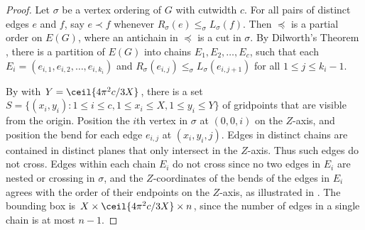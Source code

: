 \documentclass[10pt,a4paper]{article}
\begin{document}
\begin{proof} Let $\sigma$ be a vertex ordering of $G$ with cutwidth $c$. For
all pairs of distinct edges $e$ and $f$, say $e\prec f$ whenever
$R_\sigma(e)\leq_\sigma L_\sigma(f)$. Then $\preceq$ is a partial order on
$E(G)$, where an antichain in $\preceq$ is a cut in $\sigma$. By Dilworth's
Theorem \citep{Dilworth50}, there is a partition of $E(G)$ into chains
$E_1,E_2,\dots,E_c$, such that each $E_i=(e_{i,1},e_{i,2},\dots,e_{i,k_i})$ and
$R_\sigma(e_{i,j})\leq_\sigma L_\sigma(e_{i,j+1})$ for all $1\leq j\leq k_i-1$.

By  with $Y=\ceil{4\pi^2c/3X}$,  there is a set
$S=\{(x_i,y_i):1\leq i\leq c, 1\leq x_i\leq X,1\leq y_i\leq Y\}$ of gridpoints
that are visible from the origin. Position the $i$th vertex in $\sigma$ at
$(0,0,i)$ on the $Z$-axis, and position the bend for each edge $e_{i,j}$ at
$(x_i,y_i,j)$. Edges in distinct chains are contained in distinct planes that
only intersect in the $Z$-axis. Thus such edges do not cross. Edges within each
chain $E_i$ do not cross since no two edges in $E_i$ are nested or crossing in
$\sigma$, and the $Z$-coordinates of the bends of the edges in $E_i$ agrees with 
the order of their endpoints on the $Z$-axis, as illustrated in
. The bounding box is
$X\times\ceil{4\pi^2c/3X}\times n$, since the number of edges in a single chain
is at most $n-1$. \end{proof}

\end{document}
